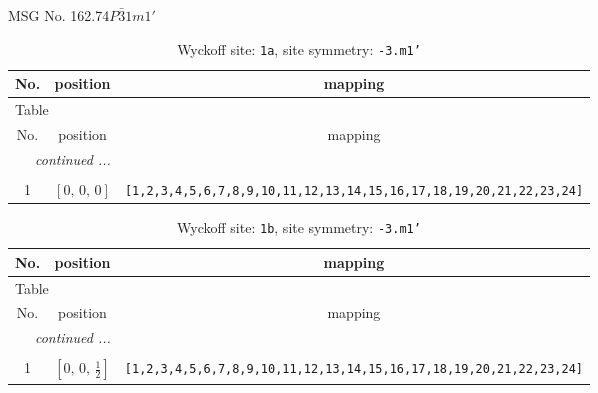\documentclass[fleqn,8pt]{jsarticle}
\begin{document}
\setcounter{MaxMatrixCols}{32}

\renewcommand{\tablename}{Table~}
\renewcommand{\figurename}{Figure~}
\begin{center}
\LARGE
MSG No. 162.74\quad$P\bar{3}1m1'$
\end{center}
\renewcommand{\arraystretch}{1.2}
\begin{longtable}{ccc}
\caption{Wyckoff site: {\tt 1a}, site symmetry: {\tt -3.m1'}}
 \\
 \hline \hline
No. & position & mapping \\ \hline \endfirsthead

\multicolumn{2}{l}{\tablename\ \thetable{}} \\
 \hline \hline
No. & position & mapping \\ \hline \endhead

 \hline \hline
\multicolumn{2}{r}{\footnotesize\it continued ...} \\ \endfoot

 \hline \hline
\multicolumn{2}{r}{} \\ \endlastfoot

1 & $\left[ 0,\, 0,\, 0 \right]$ & {\tt [1,2,3,4,5,6,7,8,9,10,11,12,13,14,15,16,17,18,19,20,21,22,23,24]} \\
\end{longtable}
\renewcommand{\arraystretch}{1.2}
\begin{longtable}{ccc}
\caption{Wyckoff site: {\tt 1b}, site symmetry: {\tt -3.m1'}}
 \\
 \hline \hline
No. & position & mapping \\ \hline \endfirsthead

\multicolumn{2}{l}{\tablename\ \thetable{}} \\
 \hline \hline
No. & position & mapping \\ \hline \endhead

 \hline \hline
\multicolumn{2}{r}{\footnotesize\it continued ...} \\ \endfoot

 \hline \hline
\multicolumn{2}{r}{} \\ \endlastfoot

1 & $\left[ 0,\, 0,\, \frac{1}{2} \right]$ & {\tt [1,2,3,4,5,6,7,8,9,10,11,12,13,14,15,16,17,18,19,20,21,22,23,24]} \\
\end{longtable}
\renewcommand{\arraystretch}{1.2}
\end{document}
